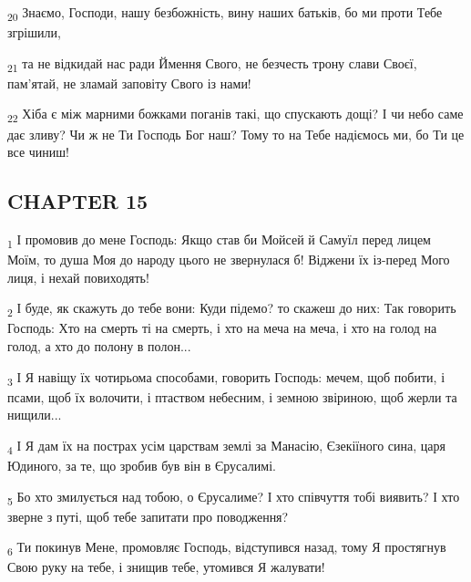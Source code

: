 \begin{tcolorbox}
\textsubscript{20} Знаємо, Господи, нашу безбожність, вину наших батьків, бо ми проти Тебе згрішили,
\end{tcolorbox}
\begin{tcolorbox}
\textsubscript{21} та не відкидай нас ради Ймення Свого, не безчесть трону слави Своєї, пам'ятай, не зламай заповіту Свого із нами!
\end{tcolorbox}
\begin{tcolorbox}
\textsubscript{22} Хіба є між марними божками поганів такі, що спускають дощі? І чи небо саме дає зливу? Чи ж не Ти Господь Бог наш? Тому то на Тебе надіємось ми, бо Ти це все чиниш!
\end{tcolorbox}
\subsection{CHAPTER 15}
\begin{tcolorbox}
\textsubscript{1} І промовив до мене Господь: Якщо став би Мойсей й Самуїл перед лицем Моїм, то душа Моя до народу цього не звернулася б! Віджени їх із-перед Мого лиця, і нехай повиходять!
\end{tcolorbox}
\begin{tcolorbox}
\textsubscript{2} І буде, як скажуть до тебе вони: Куди підемо? то скажеш до них: Так говорить Господь: Хто на смерть ті на смерть, і хто на меча на меча, і хто на голод на голод, а хто до полону в полон...
\end{tcolorbox}
\begin{tcolorbox}
\textsubscript{3} І Я навіщу їх чотирьома способами, говорить Господь: мечем, щоб побити, і псами, щоб їх волочити, і птаством небесним, і земною звіриною, щоб жерли та нищили...
\end{tcolorbox}
\begin{tcolorbox}
\textsubscript{4} І Я дам їх на пострах усім царствам землі за Манасію, Єзекіїного сина, царя Юдиного, за те, що зробив був він в Єрусалимі.
\end{tcolorbox}
\begin{tcolorbox}
\textsubscript{5} Бо хто змилується над тобою, о Єрусалиме? І хто співчуття тобі виявить? І хто зверне з путі, щоб тебе запитати про поводження?
\end{tcolorbox}
\begin{tcolorbox}
\textsubscript{6} Ти покинув Мене, промовляє Господь, відступився назад, тому Я простягнув Свою руку на тебе, і знищив тебе, утомився Я жалувати!
\end{tcolorbox}
